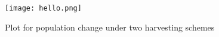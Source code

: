 \documentclass{amsart}
\newtheorem{lemma}[theorem]{Lemma}
\theoremstyle{definition}
\theoremstyle{remark}
\numberwithin{equation}{section}
\newcommand{\abs}[1]{\lvert#1\rvert}
\newcommand{\blankbox}[2]{%
  \parbox{\columnwidth}{\centering
    \setlength{\fboxsep}{0pt}%
    \fbox{\raisebox{0pt}[#2]{\hspace{#1}}}%
  }%
}
\begin{document}
\begin{figure}[h]
\texttt{[image: hello.png]}
\caption{Plot for population change under two harvesting schemes}
\label{HarvestingSchemes}
\end{figure}

\end{document}
